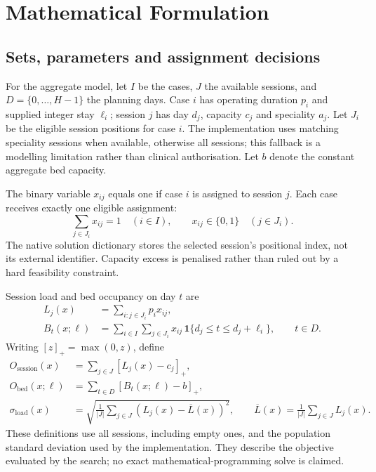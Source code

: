 \section{Mathematical Formulation}
\label{sec:formulation}

\subsection{Sets, parameters and assignment decisions}

For the aggregate model, let $I$ be the cases, $J$ the available sessions,
and $D=\{0,\ldots,H-1\}$ the planning days. Case $i$ has operating duration
$p_i$ and supplied integer stay $\ell_i$; session $j$ has day $d_j$, capacity
$c_j$ and speciality $a_j$. Let $J_i$ be the eligible session positions for
case $i$. The implementation uses matching speciality sessions when available,
otherwise all sessions; this fallback is a modelling limitation rather than
clinical authorisation. Let $b$ denote the constant aggregate bed capacity.

The binary variable $x_{ij}$ equals one if case $i$ is assigned to session
$j$. Each case receives exactly one eligible assignment:
\begin{equation}
 \sum_{j\in J_i}x_{ij}=1\quad(i\in I),\qquad
 x_{ij}\in\{0,1\}\quad(j\in J_i).
\end{equation}
The native solution dictionary stores the selected session's positional index,
not its external identifier. Capacity excess is penalised rather than ruled
out by a hard feasibility constraint.

Session load and bed occupancy on day $t$ are
\begin{align}
 L_j(x)&=\sum_{i:j\in J_i}p_i x_{ij},\\
 B_t(x;\ell)&=\sum_{i\in I}\sum_{j\in J_i}
 x_{ij}\,\mathbf{1}\{d_j\leq t\leq d_j+\ell_i\},\qquad t\in D.
\end{align}
Writing $[z]_+=\max(0,z)$, define
\begin{align}
 O_{\mathrm{session}}(x)&=\sum_{j\in J}[L_j(x)-c_j]_+,\\
 O_{\mathrm{bed}}(x;\ell)&=\sum_{t\in D}[B_t(x;\ell)-b]_+,\\
 \sigma_{\mathrm{load}}(x)&=\sqrt{\frac{1}{|J|}
 \sum_{j\in J}(L_j(x)-\overline L(x))^2},\qquad
 \overline L(x)=\frac{1}{|J|}\sum_{j\in J}L_j(x).
\end{align}
These definitions use all sessions, including empty ones, and the population
standard deviation used by the implementation. They describe the objective
evaluated by the search; no exact mathematical-programming solve is claimed.

